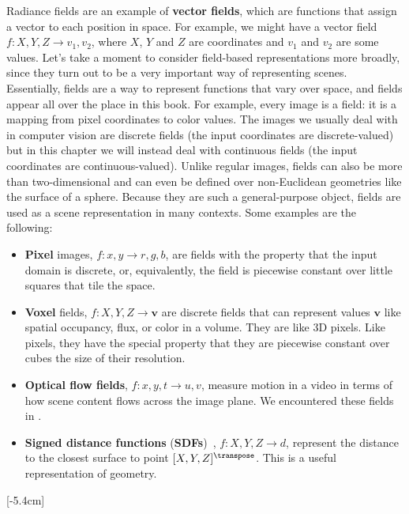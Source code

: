 Radiance fields are an example of \textbf{vector fields}, which are functions that assign a vector to each position in space. For example, we might have a vector field $f: X, Y, Z \rightarrow v_1, v_2$, where $X$, $Y$ and $Z$ are coordinates and $v_1$ and $v_2$ are some values. Let's take a moment to consider 
field-based representations more broadly, since they turn out to be a very important way of representing scenes. Essentially, fields are a way to represent functions that vary over space, and fields appear all over the place in this book. For example, every image is a field: it is a mapping from pixel coordinates to color values. The images we usually deal with in computer vision are discrete fields (the input coordinates are discrete-valued) but in this chapter we will instead deal with continuous fields (the input coordinates are continuous-valued). Unlike regular images, fields can also be more than two-dimensional and can even be defined over non-Euclidean geometries like the surface of a sphere. Because they are such a general-purpose object, fields are used as a scene representation in many contexts. Some examples are the following:
\begin{itemize}
    \item {}\textbf{Pixel} images, $f: x, y \rightarrow r, g, b$, are fields with the property that the input domain is discrete, or, equivalently, the field is piecewise constant over little squares that tile the space.
    \item {}\textbf{Voxel} fields, $f: X,Y,Z \rightarrow \mathbf{v}$ are discrete fields that can represent values $\mathbf{v}$ like spatial occupancy, flux, or color in a volume. They are like 3D pixels. Like pixels, they have the special property that they are piecewise constant over cubes the size of their resolution.
    \item {}\textbf{Optical flow fields}, $f: x, y, t \rightarrow u, v$, measure motion in a video in terms of how scene content flows across the image plane. We encountered these fields in \chap{\ref{chapter:3D_motion_and_its_2D_projection}}.
    \item {}\textbf{Signed distance functions} (\textbf{SDFs})~\cite{curless1996volumetric}, $f: X,Y,Z \rightarrow d$, represent the distance to the closest surface to point $[X,Y,Z]^\transpose$. This is a useful representation of geometry.
\end{itemize}
[-5.4cm]

